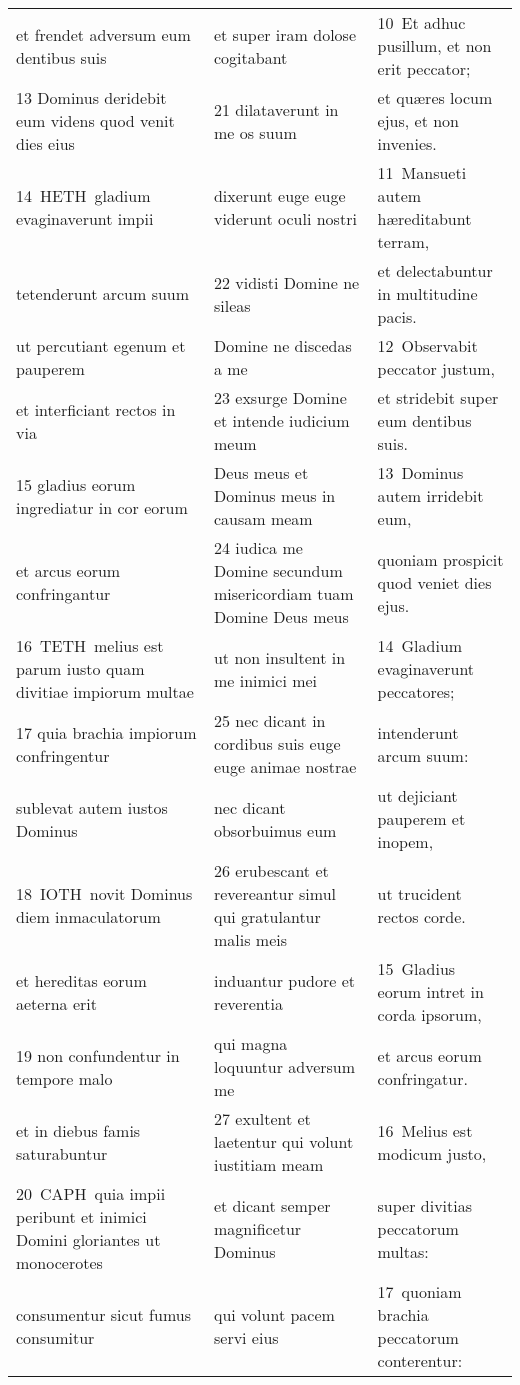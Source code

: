 \documentclass{article}
\begin{document}
\begin{longtable}{@{}p{}p{}p{}@{}}
et frendet adversum eum dentibus suis	&	et super iram dolose cogitabant	&	10 Et adhuc pusillum, et non erit peccator;	\\
13 Dominus deridebit eum videns quod venit dies eius	&	21 dilataverunt in me os suum	&	et quæres locum ejus, et non invenies.	\\
14 HETH gladium evaginaverunt impii	&	dixerunt euge euge viderunt oculi nostri	&	11 Mansueti autem hæreditabunt terram,	\\
tetenderunt arcum suum	&	22 vidisti Domine ne sileas	&	et delectabuntur in multitudine pacis.	\\
ut percutiant egenum et pauperem	&	Domine ne discedas a me	&	12 Observabit peccator justum,	\\
et interficiant rectos in via	&	23 exsurge Domine et intende iudicium meum	&	et stridebit super eum dentibus suis.	\\
15 gladius eorum ingrediatur in cor eorum	&	Deus meus et Dominus meus in causam meam	&	13 Dominus autem irridebit eum,	\\
et arcus eorum confringantur	&	24 iudica me Domine secundum misericordiam tuam Domine Deus meus	&	quoniam prospicit quod veniet dies ejus.	\\
16 TETH melius est parum iusto quam divitiae impiorum multae	&	ut non insultent in me inimici mei	&	14 Gladium evaginaverunt peccatores;	\\
17 quia brachia impiorum confringentur	&	25 nec dicant in cordibus suis euge euge animae nostrae	&	intenderunt arcum suum:	\\
sublevat autem iustos Dominus	&	nec dicant obsorbuimus eum	&	ut dejiciant pauperem et inopem,	\\
18 IOTH novit Dominus diem inmaculatorum	&	26 erubescant et revereantur simul qui gratulantur malis meis	&	ut trucident rectos corde.	\\
et hereditas eorum aeterna erit	&	induantur pudore et reverentia	&	15 Gladius eorum intret in corda ipsorum,	\\
19 non confundentur in tempore malo	&	qui magna loquuntur adversum me	&	et arcus eorum confringatur.	\\
et in diebus famis saturabuntur	&	27 exultent et laetentur qui volunt iustitiam meam	&	16 Melius est modicum justo,	\\
20 CAPH quia impii peribunt et inimici Domini gloriantes ut monocerotes	&	et dicant semper magnificetur Dominus	&	super divitias peccatorum multas:	\\
consumentur sicut fumus consumitur	&	qui volunt pacem servi eius	&	17 quoniam brachia peccatorum conterentur:	\\

\end{longtable}
\end{document}
